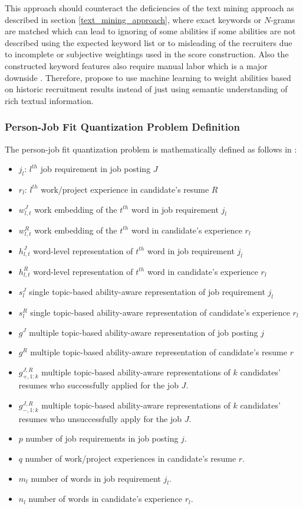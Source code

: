 \documentclass[draft,final]{thesisclass} %
\begin{document}
This approach should counteract the deficiencies of the text mining approach as described in section \ref{text_mining_approach}, where exact keywords or $N$-grams are matched which can lead to ignoring of some abilities if some abilities are not described using the expected keyword list or to misleading of the recruiters due to incomplete or subjective weightings used in the score construction.
Also the constructed keyword features also require manual labor which is a major downside \parencite[5]{pj_fit_ml}.
Therefore, \textcite[2]{pj_fit_ml} propose to use machine learning to weight abilities based on historic recruitment results instead of just using semantic understanding of rich textual information.

\subsubsection{Person-Job Fit Quantization Problem Definition}
The person-job fit quantization problem is mathematically defined as follows in \textcite[7-8]{pj_fit_ml}:
\begin{itemize}
    \item $j_l$: $l^{th}$ job requirement in job posting $J$
    \item $r_l$: $l^{th}$ work/project experience in candidate's resume $R$
    \item $w^J_{l,t}$ work embedding of the $t^{th}$ word in job requirement $j_l$
    \item $w^R_{l,t}$ work embedding of the $t^{th}$ word in candidate's experience $r_l$
    \item $h^J_{l,t}$ word-level representation of $t^{th}$ word in job requirement $j_l$
    \item $h^R_{l,t}$ word-level representation of $t^{th}$ word in candidate's experience $r_l$
    \item $s^J_l$ single topic-based ability-aware representation of job requirement $j_l$
    \item $s^R_l$ single topic-based ability-aware representation of candidate's experience $r_l$
    \item $g^J$ multiple topic-based ability-aware representation of job posting $j$
    \item $g^R$ multiple topic-based ability-aware representation of candidate's resume $r$
    \item $g^{J,R}_{+,1:k}$ multiple topic-based ability-aware representations of $k$ candidates' resumes who successfully applied for the job $J$.
    \item $g^{J,R}_{-,1:k}$ multiple topic-based ability-aware representations of $k$ candidates' resumes who unsuccessfully apply for the job $J$.
    \item $p$ number of job requirements in job posting $j$.
    \item $q$ number of work/project experiences in candidate's resume $r$.
    \item $m_l$ number of words in job requirement $j_l$.
    \item $n_l$ number of words in candidate's experience $r_l$.
\end{itemize}
\end{document}
